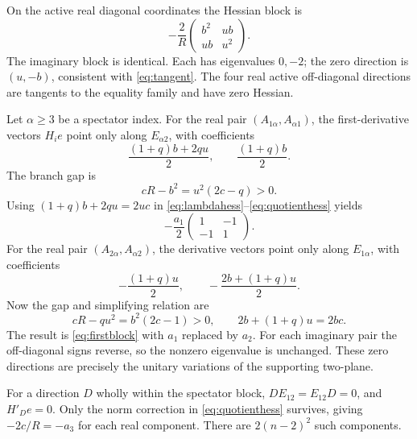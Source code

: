 \documentclass[11pt,a4paper]{article}
\begin{document}
On the active real diagonal coordinates the Hessian block is
\begin{equation}
 -\frac2R\begin{pmatrix}b^2&ub\\ub&u^2\end{pmatrix}.
 \label{eq:activeblock}
\end{equation}
The imaginary block is identical. Each has eigenvalues \(0,-2\);
the zero direction is \((u,-b)\), consistent with
\eqref{eq:tangent}. The four real active off-diagonal directions
are tangents to the equality family and have zero Hessian.

Let \(\alpha\geq3\) be a spectator index.
For the real pair \((A_{1\alpha},A_{\alpha1})\),
the first-derivative vectors \(H_i e\) point only along
\(E_{\alpha2}\), with coefficients
\begin{equation}
 \frac{(1+q)b+2qu}{2},\qquad \frac{(1+q)b}{2}.
\end{equation}
The branch gap is
\begin{equation}
 cR-b^2=u^2(2c-q)>0.
\end{equation}
Using \((1+q)b+2qu=2uc\) in
\eqref{eq:lambdahess}--\eqref{eq:quotienthess} yields
\begin{equation}
 -\frac{a_1}{2}
 \begin{pmatrix}1&-1\\-1&1\end{pmatrix}.
 \label{eq:firstblock}
\end{equation}
For the real pair \((A_{2\alpha},A_{\alpha2})\), the
derivative vectors point only along \(E_{1\alpha}\), with
coefficients
\begin{equation}
 -\frac{(1+q)u}{2},\qquad
 -\frac{2b+(1+q)u}{2}.
\end{equation}
Now the gap and simplifying relation are
\begin{equation}
 cR-qu^2=b^2(2c-1)>0,\qquad
 2b+(1+q)u=2bc.
\end{equation}
The result is \eqref{eq:firstblock} with \(a_1\) replaced
by \(a_2\). For each imaginary pair the off-diagonal
signs reverse, so the nonzero eigenvalue is unchanged.
These zero directions are precisely the unitary variations
of the supporting two-plane.

For a direction \(D\) wholly within the spectator block,
\(DE_{12}=E_{12}D=0\), and \(H'_D e=0\).
Only the norm correction in \eqref{eq:quotienthess}
survives, giving \(-2c/R=-a_3\) for each real component.
There are \(2(n-2)^2\) such components.
\end{document}
